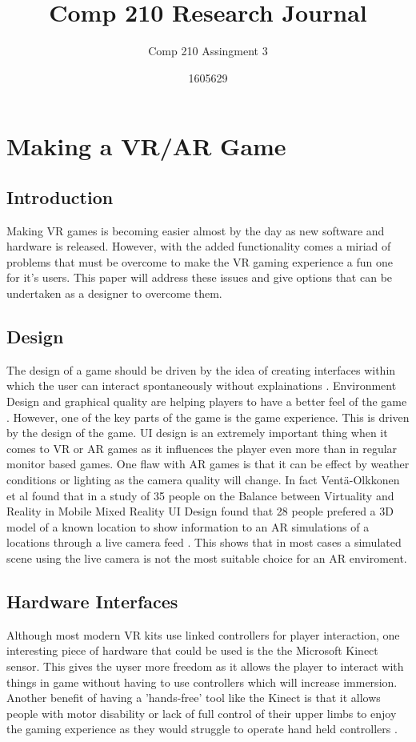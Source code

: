 \documentclass{scrartcl}
\title{Comp 210 Research Journal}
\subtitle{Comp 210 Assingment 3}
\author{1605629}
\begin{document}
\maketitle

\section{Making a VR/AR Game}
\subsection{Introduction}
Making VR games is becoming easier almost by the day as new software and hardware is released. However, with the added functionality comes a miriad of problems that must be overcome to make the VR gaming experience a fun one for it's users. This paper will address these issues and give options that can be undertaken as a designer to overcome them.

\subsection{Design}
The design of a game should be driven by the idea of creating interfaces within which the user can interact spontaneously without explainations \cite{spanogianopoulos2014human}. Environment Design and graphical quality are helping players to have  a better feel of the game \cite{mentzelopoulos2015hardware}. However, one of the key parts of the game is the game experience. This is driven by the design of the game. UI design is an extremely important thing when it comes to VR or AR games as it influences the player even more than in regular monitor based games. One flaw with AR games is that it can be effect by weather conditions or lighting as the camera quality will change. In fact Ventä-Olkkonen et al found that in a study of 35 people on the  Balance between Virtuality and Reality in Mobile Mixed Reality UI Design found that 28 people prefered a 3D model of a known location to show information to an AR simulations of a locations through a live camera feed \cite{venta2014investigating}. This shows that in most cases a simulated scene using the live camera is not the most suitable choice for an AR enviroment.

\subsection{Hardware Interfaces}
Although most modern VR kits use linked controllers for player interaction, one interesting piece of hardware that could be used is the the Microsoft Kinect sensor. This gives the uyser more freedom as it allows the player to interact with things in game without having to use controllers \cite {mentzelopoulos2015hardware} which will increase immersion. Another benefit of having a 'hands-free' tool like the Kinect is that it allows people with motor disability or lack of full control of their upper limbs to enjoy the gaming experience as they would struggle to operate hand held controllers \cite {oskoei2009application}.
\end{document}
